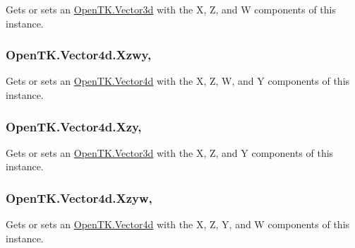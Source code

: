 Gets or sets an \hyperlink{struct_open_t_k_1_1_vector3d}{Open\-T\-K.\-Vector3d} with the X, Z, and W components of this instance. 

\hypertarget{struct_open_t_k_1_1_vector4d_a6f89fd12856113a06849c4693875b7bd}{
\subsubsection[{Xzwy}]{ Open\-T\-K.\-Vector4d.\-Xzwy\hspace{0.3cm}{\ttfamily [get]}, {\ttfamily [set]}}}\label{struct_open_t_k_1_1_vector4d_a6f89fd12856113a06849c4693875b7bd}


Gets or sets an \hyperlink{struct_open_t_k_1_1_vector4d}{Open\-T\-K.\-Vector4d} with the X, Z, W, and Y components of this instance. 

\hypertarget{struct_open_t_k_1_1_vector4d_ae97427057c354728905f292554a2816c}{
\subsubsection[{Xzy}]{ Open\-T\-K.\-Vector4d.\-Xzy\hspace{0.3cm}{\ttfamily [get]}, {\ttfamily [set]}}}\label{struct_open_t_k_1_1_vector4d_ae97427057c354728905f292554a2816c}


Gets or sets an \hyperlink{struct_open_t_k_1_1_vector3d}{Open\-T\-K.\-Vector3d} with the X, Z, and Y components of this instance. 

\hypertarget{struct_open_t_k_1_1_vector4d_a4c645af829f25930623587c73d88e151}{
\subsubsection[{Xzyw}]{ Open\-T\-K.\-Vector4d.\-Xzyw\hspace{0.3cm}{\ttfamily [get]}, {\ttfamily [set]}}}\label{struct_open_t_k_1_1_vector4d_a4c645af829f25930623587c73d88e151}


Gets or sets an \hyperlink{struct_open_t_k_1_1_vector4d}{Open\-T\-K.\-Vector4d} with the X, Z, Y, and W components of this instance. 

